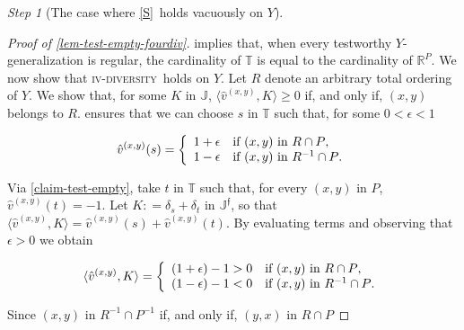 \documentclass[ecta,nameyear,draft]{econsocart}
\newcommand{\R}{\mathbb R}
\newcommand{\novel}{\mathfrak f}
\newcommand{\mbbt}{{\mathds {T}}}
\newcommand{\mbbj}{\mathds J}
\newcommand{\mbbjp}{{\mathds {J}^{\novel}}}
\newcommand{\xy}{{(x, y)}}
\newcommand{\yx}{{(y, x)}}
\newcommand{\stability}{\ref{S}}
\newcommand{\fourdiv}{\textsc{iv}-\textsc{diversity}}
\theoremstyle{plain}
\theoremstyle{remark}
\newtheorem{step}{Step}[section]
\begin{document}
\begin{appendix}
\begin{step}[The case where \stability\ holds vacuously on $Y$]
\begin{proof}[Proof of \cref{lem-test-empty-fourdiv}]
       implies that, when every testworthy
      $Y$-generalization is regular, the cardinality of $\mbbt$ is equal to the
      cardinality of $\R^{P}$.  We now show that \fourdiv\ holds on $Y$. Let
      ${R}$ denote an arbitrary total ordering of $Y$.  We show that, for some
      $K$ in $\mbbj$, $\langle \hat{v}^{\xy}, K \rangle \geq 0$ if, and only if,
      $\xy$ belongs to ${R}$.  ensures that we can choose
      $s$ in $\mbbt$ such that, for some $0 < \epsilon <1$
      \begin{linenomath*}
        \begin{equation*}
          \hat{v}^{\xy} ( s ) = \left \{
            \begin{array}{l l}
              1+ \epsilon & \text{if $\xy$ in ${R} \cap P $},\\
              1-\epsilon & \text{if $\xy$ in ${R}^{- 1} \cap P $}.
            \end{array}
          \right.
        \end{equation*}
      \end{linenomath*}
      Via \cref{claim-test-empty}, take $t$ in $\mbbt$ such that, for every $\xy$
      in $P$, $\hat{v}^{\xy} ( t ) = -1$.  Let $K : = \delta _{s} + \delta _{t }$
      in $\mbbjp$, so that $\langle \hat{v}^{\xy}, K \rangle = \hat{v}^{\xy}(s) +
      \hat{v}^{\xy}(t)$. By evaluating terms and observing that $\epsilon > 0$ we
      obtain
      \begin{linenomath*} 
        \begin{equation*}
          \langle \hat{v}^{\xy}, K \rangle = \left \{
            \begin{array}{l l}
              (1+ \epsilon) - 1 > 0 & \text{if $\xy$ in ${R} \cap P $},\\
              (1- \epsilon) - 1 < 0 & \text{if $\xy$ in ${R}^{-1}\cap P$}.
            \end{array}
          \right.
        \end{equation*}
      \end{linenomath*} 
      Since $\xy$ in ${R}^{-1} \cap P^{-1}$ if, and only if, $\yx$ in ${R}\cap P$

\end{proof}
\end{step}
\end{appendix}
\end{document}
